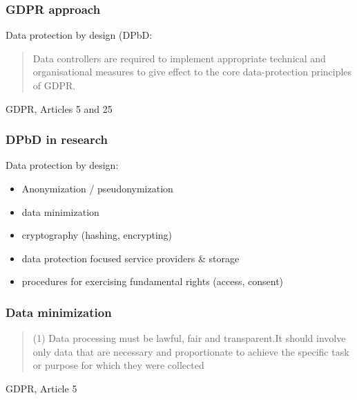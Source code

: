 \documentclass[17pt,aspectratio=169,hyperref={pdfusetitle,colorlinks,allcolors=olive}]{beamer}
\begin{document}
\begin{frame}[fragile]
  \frametitle{GDPR approach}

  Data protection by design (DPbD:\\

  \vspace{.5cm}
  \begin{quote}
    Data  controllers are required  to  implement appropriate technical and organisational measures to give effect to the core data-protection principles of GDPR.
  \end{quote}

  \begin{flushright}
  GDPR, Articles 5 and 25
  \end{flushright}
  
\end{frame}

\begin{frame}[fragile]
  \frametitle{DPbD in research}

  Data protection by design:\\

  \begin{itemize}
  \item Anonymization / pseudonymization
  \item data minimization
  \item cryptography (hashing, encrypting)
  \item data protection focused service providers \& storage
  \item procedures for exercising fundamental rights (access, consent)
  \end{itemize}
  
\end{frame}

\begin{frame}[fragile]
  \frametitle{Data minimization}

  \begin{quote}
  (1) Data  processing  must  be  lawful,  fair  and  transparent.It  should  involve  only  data  that  are  necessary  and proportionate to achieve the specific task or purpose for which they were collected
  \end{quote}

  \begin{flushright}
    GDPR, Article 5
  \end{flushright}
\end{frame}
\end{document}
